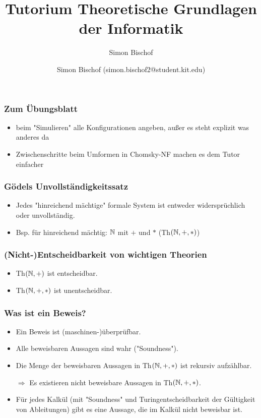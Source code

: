 \documentclass{beamer}
\author{Simon Bischof (simon.bischof2@student.kit.edu)}
\title{Tutorium Theoretische Grundlagen der Informatik}
\subtitle{Simon Bischof}
\institute{Institut f\"{u}r Kryptographie und Sicherheit}
\newcommand{\N}{\ensuremath \mathbb{N}}
\begin{document}
\begin{frame}
\maketitle
\end{frame}

\begin{frame}
\frametitle{Zum Übungsblatt}
\begin{itemize}
\item beim "Simulieren" alle Konfigurationen angeben, außer es steht explizit was anderes da
\item Zwischenschritte beim Umformen in Chomsky-NF machen es dem Tutor einfacher
\end{itemize}
\end{frame}

\begin{frame}
\frametitle{Gödels Unvollständigkeitssatz}
\begin{itemize}
\item Jedes "hinreichend mächtige" formale System ist entweder widersprüchlich oder unvollständig.\pause
\item Bsp. für hinreichend mächtig: $\N$ mit $+$ und $*$ (Th$(\N,+,*)$)
\end{itemize}
\end{frame}

\begin{frame}
\frametitle{(Nicht-)Entscheidbarkeit von wichtigen Theorien}
\begin{itemize}
\item Th$(\N,+)$ ist entscheidbar.\pause
\vspace{1cm}
\item Th$(\N,+,*)$ ist unentscheidbar.
\end{itemize}
\end{frame}

\begin{frame}
\frametitle{Was ist ein Beweis?}
\begin{itemize}
\item Ein Beweis ist (maschinen-)überprüfbar.
\item Alle beweisbaren Aussagen sind wahr ("Soundness").\pause
\item Die Menge der beweisbaren Aussagen in Th$(\N,+,*)$ ist rekursiv aufzählbar.
\item[$\Rightarrow$] Es existieren nicht beweisbare Aussagen in Th$(\N,+,*)$.\pause
\item Für jedes Kalkül (mit "Soundness" und Turingentscheidbarkeit der Gültigkeit von Ableitungen) gibt es eine Aussage, die im Kalkül nicht beweisbar ist.
\end{itemize}
\end{frame}
\end{document}
